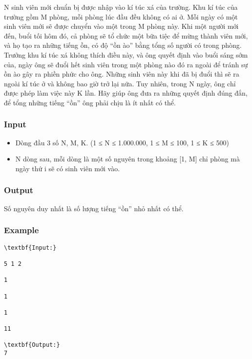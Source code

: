 



   N sinh viên mới chuẩn bị được nhập vào kí túc xá của trường. Khu kí túc của trường gồm M phòng, mỗi phòng lúc đầu đều không có ai ở. Mỗi ngày có một sinh viên mới sẽ được chuyển vào một trong M phòng này. Khi một người mới đến, buổi tối hôm đó, cả phòng sẽ tổ chức một bữa tiệc để mừng thành viên mới, và họ tạo ra những tiếng ồn, có độ “ồn ào” bằng tổng số người có trong phòng. Trưởng khu kí túc xá không thích điều này, và ông quyết định vào buổi sáng sớm của, ngày ông sẽ đuổi hết sinh viên trong một phòng nào đó ra ngoài để tránh sự ồn ào gây ra phiền phức cho ông. Những sinh viên này khi đã bị đuổi thì sẽ ra ngoài kí túc ở và không bao giờ trở lại nữa. Tuy nhiên, trong N ngày, ông chỉ được phép làm việc này K lần. Hãy giúp ông đưa ra những quyết định đúng đắn, để tổng những tiếng “ồn” ông phải chịu là ít nhất có thể.  

\subsubsection{   Input  }
\begin{itemize}
	\item     Dòng đầu 3 số N, M, K. (1 ≤ N ≤ 1.000.000, 1 ≤ M ≤ 100, 1 ≤ K ≤ 500)   
	\item     N dòng sau, mỗi dòng là một số nguyên trong khoảng [1, M] chỉ phòng mà ngày thứ i sẽ có sinh viên mới vào.   
\end{itemize}

\subsubsection{   Output  }

   Số nguyên duy nhất là số lượng tiếng “ồn” nhỏ nhất có thể.  

\subsubsection{   Example  }
\begin{verbatim}
\textbf{Input:}

5 1 2

1

1

1

11

\textbf{Output:}
7\end{verbatim}